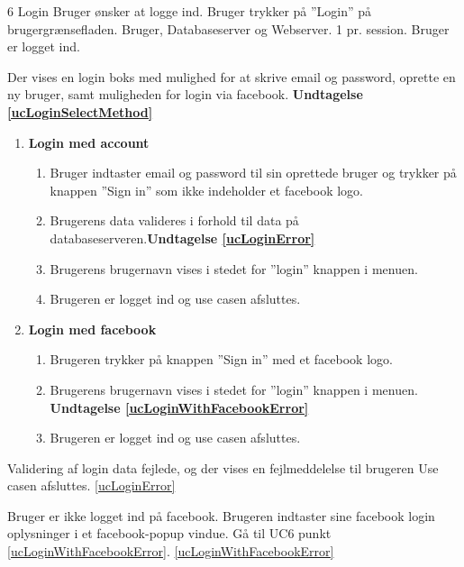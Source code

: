 
\uchead
	{6}
	{Login}
	{Bruger ønsker at logge ind.}
	{Bruger trykker på ''Login'' på brugergrænsefladen.}
	{Bruger, Databaseserver og Webserver.}
	{}
	{1 pr. session.}
	{Bruger er logget ind.}	
  
		
\item \label{ucLoginSelectMethod} Der vises en login boks med mulighed for at skrive email og password, oprette en ny bruger, samt muligheden for login via facebook. \textbf{Undtagelse \ref{ucLoginSelectMethod}}

\begin{enumerate}

\item \textbf{Login med account}

	\begin{enumerate}
		\item Bruger indtaster email og password til sin oprettede bruger og trykker på knappen ''Sign in'' som ikke indeholder et facebook logo.
		\item \label{ucLoginError}Brugerens data valideres i forhold til data på databaseserveren.\textbf{Undtagelse \ref{ucLoginError}}
		\item Brugerens brugernavn vises i stedet for ''login'' knappen i menuen.
		\item Brugeren er logget ind og use casen afsluttes.
	\end{enumerate}
	
\item \textbf{Login med facebook}
	
	\begin{enumerate}
		\item Brugeren trykker på knappen ''Sign in'' med et facebook logo.
		\item\label{ucLoginWithFacebookError} Brugerens brugernavn vises i stedet for ''login'' knappen i menuen. \textbf{Undtagelse \ref{ucLoginWithFacebookError}}
		\item Brugeren er logget ind og use casen afsluttes.
				
	\end{enumerate}
\end{enumerate}

\ucdescriptionend %
	\ucextension
	{Validering af login data fejlede, og der vises en fejlmeddelelse til brugeren }
	{Use casen afsluttes.}
	{\ref{ucLoginError}}

\ucextension
	{Bruger er ikke logget ind på facebook. Brugeren indtaster sine facebook login oplysninger i et facebook-popup vindue.}
	{Gå til UC6 punkt \ref{ucLoginWithFacebookError}.}
	{\ref{ucLoginWithFacebookError}}


